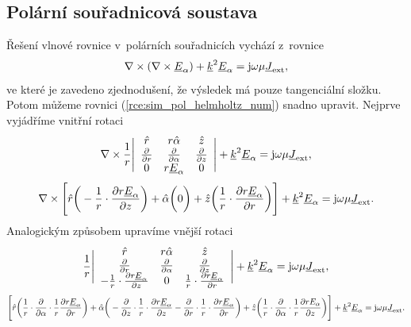 \subsection{Polární souřadnicová soustava}
Řešení vlnové rovnice v~polárních souřadnicích vychází z~rovnice
\begin{equation}
	\nabla\times(\nabla\times{\underline{E}}_{\alpha}) +{\underline{k}}^{2}{\underline{E}}_{\alpha} = \mathrm{j}\omega\mu{\underline{J}}_{\mathrm{ext}},
	\label{rce:sim_pol_helmholtz_num} 
\end{equation}
ve které je zavedeno zjednodušení, že výsledek má pouze tangenciální složku. Potom můžeme rovnici (\ref{rce:sim_pol_helmholtz_num}) snadno upravit. Nejprve vyjádříme vnitřní rotaci
\begin{displaymath}
	\nabla\times \frac{1}{r}\Bigg|
	\begin{array}{ccc}
\hat{r} & r\hat{\alpha} & \hat{z} \\
\frac{\partial}{\partial r} & \frac{\partial}{\partial \alpha} & \frac{\partial}{\partial z} \\
0 & r{\underline{E}}_{\alpha} & 0\\
\end{array}\Bigg| +{\underline{k}}^{2}{\underline{E}}_{\alpha} = \mathrm{j}\omega\mu{\underline{J}}_{\mathrm{ext}},
\end{displaymath}
\begin{displaymath}
\nabla\times \Bigg[\hat{r}\bigg(-\frac{1}{r}\cdot\frac{\partial r{\underline{E}}_{\alpha}}{\partial z}\bigg) + \hat{\alpha}\bigg(0\bigg) + \hat{z}\bigg(\frac{1}{r}\cdot\frac{\partial r{\underline{E}}_{\alpha}}{\partial r}\bigg) \Bigg]+{\underline{k}}^{2}{\underline{E}}_{\alpha} = \mathrm{j}\omega\mu{\underline{J}}_{\mathrm{ext}}.
\end{displaymath}
Analogickým způsobem upravíme vnější rotaci
\begin{displaymath}
	\frac{1}{r}\Bigg|
	\begin{array}{ccc}
\hat{r} & r\hat{\alpha} & \hat{z} \\
\frac{\partial}{\partial r} & \frac{\partial}{\partial \alpha} & \frac{\partial}{\partial z} \\
-\frac{1}{r}\cdot\frac{\partial r{\underline{E}}_{\alpha}}{\partial z} & 0 & \frac{1}{r}\cdot\frac{\partial r{\underline{E}}_{\alpha}}{\partial r}\\
\end{array}\Bigg| +{\underline{k}}^{2}{\underline{E}}_{\alpha} = \mathrm{j}\omega\mu{\underline{J}}_{\mathrm{ext}},
\end{displaymath}
\begin{equation}
\Bigg[\hat{r}\bigg(\frac{1}{r}\cdot\frac{\partial}{\partial \alpha}\cdot\frac{1}{r}\frac{\partial r{\underline{E}}_{\alpha}}{\partial r}\bigg) + \hat{\alpha}\bigg(-\frac{\partial}{\partial z}\cdot\frac{1}{r}\cdot\frac{\partial r{\underline{E}}_{\alpha}}{\partial z} - \frac{\partial}{\partial r}\cdot\frac{1}{r}\cdot\frac{\partial r{\underline{E}}_{\alpha}}{\partial r}\bigg) + \hat{z}\bigg(\frac{1}{r}\cdot\frac{\partial}{\partial \alpha}\cdot\frac{1}{r}\frac{\partial r E_{\alpha}}{\partial z}\bigg) \Bigg]+{\underline{k}}^{2}{\underline{E}}_{\alpha} = \mathrm{j}\omega\mu{\underline{J}}_{\mathrm{ext}}.
	\label{rce:sim_pol_rotace2}
\end{equation}
